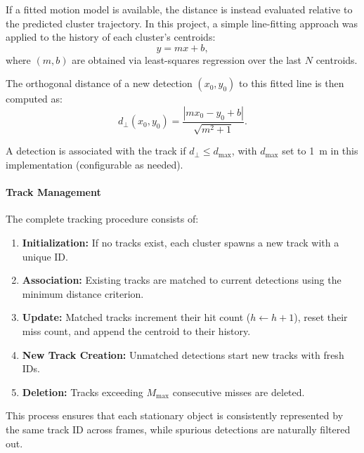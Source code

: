 If a fitted motion model is available, the distance is instead evaluated relative to the predicted cluster trajectory.  
In this project, a simple line-fitting approach was applied to the history of each cluster’s centroids:
\begin{equation}
    y = m x + b,
\end{equation}
where $(m,b)$ are obtained via least-squares regression over the last $N$ centroids.  

The orthogonal distance of a new detection $(x_0, y_0)$ to this fitted line is then computed as:
\begin{equation}
    d_{\perp}(x_0, y_0) = \frac{|m x_0 - y_0 + b|}{\sqrt{m^2 + 1}}.
\end{equation}

A detection is associated with the track if $d_{\perp} \leq d_{\text{max}}$, with $d_{\text{max}}$ set to \SI{1}{m} in this implementation (configurable as needed).
\paragraph{Track Management}
The complete tracking procedure consists of:
\begin{enumerate}
    \item \textbf{Initialization:} If no tracks exist, each cluster spawns a new track with a unique ID.
    \item \textbf{Association:} Existing tracks are matched to current detections using the minimum distance criterion.
    \item \textbf{Update:} Matched tracks increment their hit count ($h \leftarrow h+1$), reset their miss count, and append the centroid to their history.
    \item \textbf{New Track Creation:} Unmatched detections start new tracks with fresh IDs.
    \item \textbf{Deletion:} Tracks exceeding $M_{\text{max}}$ consecutive misses are deleted.
\end{enumerate}

This process ensures that each stationary object is consistently represented by the same track ID across frames, while spurious detections are naturally filtered out.

